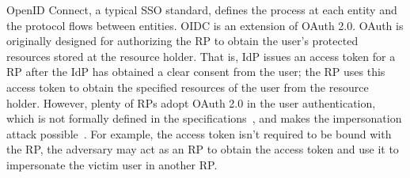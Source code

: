 OpenID Connect, a typical SSO standard,  defines the process at each entity and the protocol flows between entities.
OIDC is  an extension of OAuth 2.0. 
OAuth is originally designed for authorizing the RP to obtain the user's protected resources stored at the resource holder. 
That is, IdP issues an access token for a RP after the IdP has obtained a clear consent from the user;
 the RP uses this access token to obtain the specified resources of the user from the resource holder.
However, plenty of RPs adopt OAuth 2.0 in the user authentication, which is not formally defined in the specifications~\cite{rfc6749,rfc6750}, and makes the impersonation attack possible~\cite{ChenPCTKT14, WangZLG16}.
For example, the access token isn't required to be bound with the RP, the adversary may act as an RP to obtain the access token and use it to impersonate the victim user in another RP.



